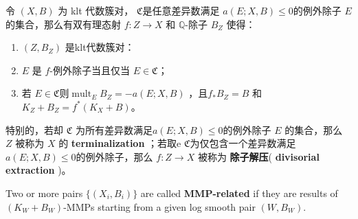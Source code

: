 \begin{corollary}\label{extraction}
	\cite[Corollary 13.7]{haconMinimalModelProgram2012} 令 $ (X,B) $ 为 klt 代数簇对， $\mathfrak{C}$是任意差异数满足 $ a(E;X,B)\leqslant 0 $的例外除子 $E$ 的集合，那么有双有理态射 $ f:Z\to X $ 和 $ \mathbb{Q} $-除子 $ B_Z $ 使得：
	\begin{enumerate}
		\item $ (Z,B_Z) $ 是klt代数簇对：
		\item $ E $ 是 $f$-例外除子当且仅当 $ E\in \mathfrak{C} $；
		\item  若 $E \in \mathfrak{C}$则$ \operatorname{mult}_{E}B_Z=-a(E;X,B) $ ，且$ f_*B_Z=B $ 和 $ K_Z+B_Z=f^*(K_X+B) $。
	\end{enumerate}
	特别的，若却 $\mathfrak{C}$ 为所有差异数满足$a(E; X, B)\leqslant 0$的例外除子 $E$ 的集合，那么 $ Z $ 被称为 $X$ 的 \textbf{terminalization} ；若取e $\mathfrak{C}$为仅包含一个差异数满足 $a(E; X, B)\leqslant 0$的例外除子，那么 $ f: Z\to X $ 被称为 \textbf{除子解压}( \textbf{divisorial extraction} )。
\end{corollary}

\begin{defn}
	\cite[Definition 3.3]{brunoLogSarkisovProgram1995}
	Two or more pairs $ \{(X_i,B_i)\} $ are called \textbf{MMP-related} if they are results of $ (K_W+B_W) $-MMPs starting from a given log smooth pair $(W,B_{W})$.
\end{defn}

